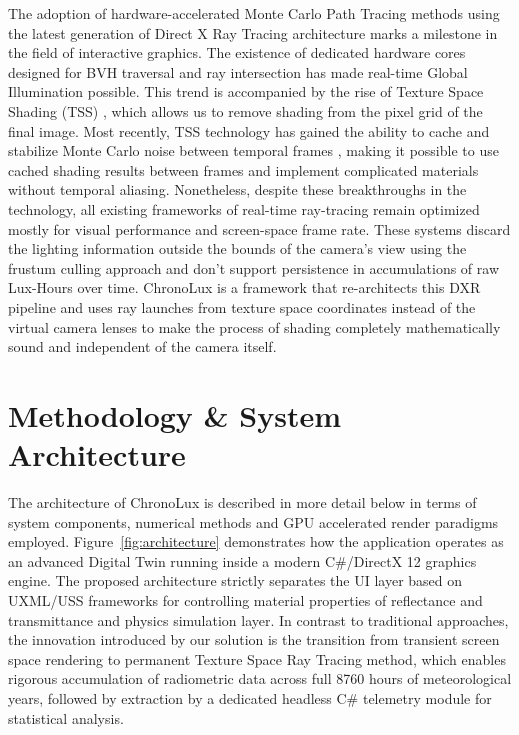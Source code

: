 \documentclass[conference]{IEEEtran}
\begin{document}
The adoption of hardware-accelerated Monte Carlo Path Tracing methods \cite{kajiya1986rendering, veach1995optimally} using the latest generation of Direct X Ray Tracing architecture \cite{burgess2020rtx} marks a milestone in the field of interactive graphics. The existence of dedicated hardware cores designed for BVH traversal and ray intersection has made real-time Global Illumination possible. This trend is accompanied by the rise of Texture Space Shading (TSS) \cite{hasselgren2016texture}, which allows us to remove shading from the pixel grid of the final image. Most recently, TSS technology has gained the ability to cache and stabilize Monte Carlo noise between temporal frames \cite{smith2024texture}, making it possible to use cached shading results between frames and implement complicated materials without temporal aliasing. Nonetheless, despite these breakthroughs in the technology, all existing frameworks of real-time ray-tracing remain optimized mostly for visual performance and screen-space frame rate. These systems discard the lighting information outside the bounds of the camera's view using the frustum culling approach and don't support persistence in accumulations of raw Lux-Hours over time. ChronoLux is a framework that re-architects this DXR pipeline and uses ray launches from texture space coordinates instead of the virtual camera lenses to make the process of shading completely mathematically sound and independent of the camera itself.

\section{Methodology \& System Architecture}

The architecture of ChronoLux is described in more detail below in terms of system components, numerical methods and GPU accelerated render paradigms employed. Figure~\ref{fig:architecture} demonstrates how the application operates as an advanced Digital Twin running inside a modern C\#/DirectX 12 graphics engine. The proposed architecture strictly separates the UI layer based on UXML/USS frameworks for controlling material properties of reflectance and transmittance and physics simulation layer. In contrast to traditional approaches, the innovation introduced by our solution is the transition from transient screen space rendering to permanent Texture Space Ray Tracing method, which enables rigorous accumulation of radiometric data across full 8760 hours of meteorological years, followed by extraction by a dedicated headless C\# telemetry module for statistical analysis.
\end{document}
